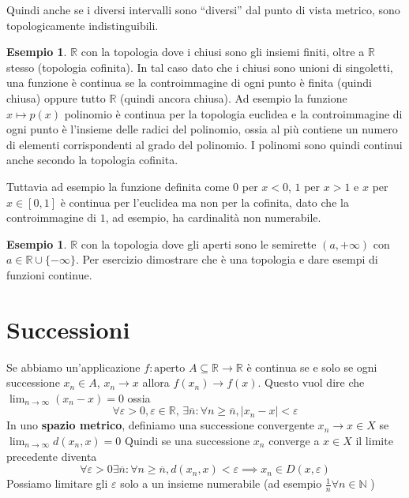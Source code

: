 \documentclass{article}
\newcounter{theo}[section]\setcounter{theo}{0}
\newcounter{excounter}[section]\setcounter{excounter}{0}
\theoremstyle{plain}
\theoremstyle{definition}
\newtheorem{example}[excounter]{Esempio}
\theoremstyle{remark}
\begin{document}
Quindi anche se i diversi intervalli sono ``diversi'' dal punto di vista
metrico, sono topologicamente indistinguibili.
\begin{example}
    \(\mathbb{R}\) con la topologia dove i chiusi sono gli insiemi finiti, oltre
    a \(\mathbb{R}\) stesso (topologia cofinita). In tal caso dato che i chiusi
    sono unioni di singoletti, una funzione è continua se la controimmagine di
    ogni punto è finita (quindi chiusa) oppure tutto \(\mathbb{R}\) (quindi
    ancora chiusa). Ad esempio la funzione \(x \mapsto p(x)\) polinomio è
    continua per la topologia euclidea e la controimmagine di ogni punto è
    l'insieme delle radici del polinomio, ossia al più contiene un numero di
    elementi corrispondenti al grado del polinomio. I polinomi sono quindi
    continui anche secondo la topologia cofinita.

    Tuttavia ad esempio la funzione definita come \(0\) per \(x < 0\), \(1\) per
    \(x > 1\) e \(x\) per \(x \in [0, 1]\) è continua per l'euclidea ma non per
    la cofinita, dato che la controimmagine di \(1\), ad esempio, ha cardinalità
    non numerabile.
\end{example}

\begin{example}
    \(\mathbb{R}\) con la topologia dove gli aperti sono le semirette \((a,
    +\infty)\) con \(a \in \mathbb{R} \cup \{-\infty\} \). Per esercizio
    dimostrare che è una topologia e dare esempi di funzioni continue.
\end{example}

\section{Successioni}
Se abbiamo un'applicazione \(f : \text{aperto }A \subseteq  \mathbb{R} \to  \mathbb{R}\) è
continua se e solo se ogni successione \(x_{n} \in A\), \(x_{n} \to  x\) allora
\(f(x_{n}) \to  f(x)\). Questo vuol dire che \(\lim_{n \to \infty}(x_{n} - x) =
0\) ossia 
\[
    \forall \varepsilon > 0, \varepsilon \in \mathbb{R}, \, \exists \overline{n}
    : \forall n \ge \overline{n}, |x_{n} - x| < \varepsilon
\]
In uno \textbf{spazio metrico}, definiamo una successione convergente 
\(x_{n} \to x \in X\) se \(\lim_{n \to  \infty} {d (x_{n}, x)} = 0\) 
Quindi se una successione \(x_{n}\) converge a \(x \in  X\) il limite precedente diventa
\[
    \forall  \varepsilon > 0 \exists  \overline{n} : \forall n \ge
    \overline{n}, d(x_{n}, x) < \varepsilon \implies x_{n} \in D(x, \varepsilon)
\]
Possiamo limitare gli \(\varepsilon\) solo a un insieme numerabile (ad esempio
\(\frac{1}{n} \forall  n \in \mathbb{N}\) )
\end{document}
